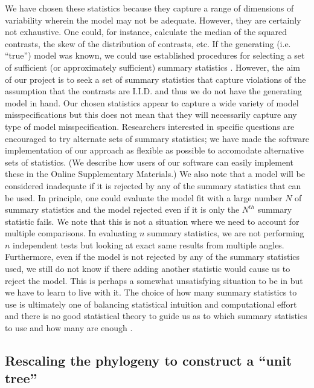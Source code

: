 \documentclass[a4paper,12pt]{article}
\begin{document}
We have chosen these statistics because they capture a range of dimensions of variability wherein the model may not be adequate. However, they are certainly not exhaustive. One could, for instance, calculate the median of the squared contrasts, the skew of the distribution of contrasts, etc. If the generating (i.e. ``true'') model was known, we could use established procedures for selecting a set of sufficient (or approximately sufficient) summary statistics \citep[e.g.][]{MajoramJoyce, Slater2012MECCA}. However, the aim of our project is to seek a set of summary statistics that capture violations of the assumption that the contrasts are I.I.D. and thus we do not have the generating model in hand. Our chosen statistics appear to capture a wide variety of model misspecifications but this does not mean that they will necessarily capture any type of model misspecification. Researchers interested in specific questions are encouraged to try alternate sets of summary statistics; we have made the software implementation of our approach as flexible as possible to accomodate alternative sets of statistics. (We describe how users of our software can easily implement these in the Online Supplementary Materials.) We also note that a model will be considered inadequate if it is rejected by any of the summary statistics that can be used. In principle, one could evaluate the model fit with a large number $N$ of summary statistics and the model rejected even if it is only the $N^{th}$ summary statistic fails. We note that this is not a situation where we need to account for multiple comparisons. In evaluating $n$ summary statistics, we are not performing $n$ independent tests but looking at exact same results from multiple angles. Furthermore, even if the model is not rejected by any of the summary statistics used, we still do not know if there adding another statistic would cause us to reject the model. This is perhaps a somewhat unsatisfying situation to be in but we have to learn to live with it. The choice of how many summary statistics to use is ultimately one of balancing statistical intuition and computational effort and there is no good statistical theory to guide us as to which summary statistics to use and how many are enough \citep{Gelmanbook}.

\subsection*{Rescaling the phylogeny to construct a ``unit tree''}
\end{document}
